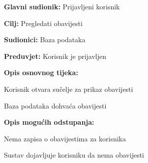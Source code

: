 \noindent {}
\begin{packed_item}

\item \textbf{Glavni sudionik:} Prijavljeni korisnik
\item  \textbf{Cilj:} Pregledati obavijesti
\item  \textbf{Sudionici:} Baza podataka
\item  \textbf{Preduvjet:} Korisnik je prijavljen
\item  \textbf{Opis osnovnog tijeka:}

\item[] \begin{packed_enum}

    \item Korisnik otvara sučelje za prikaz obavijesti
    \item Baza podataka dohvaća obavijesti

\end{packed_enum}

\item  \textbf{Opis mogućih odstupanja:}

\item[] \begin{packed_item}

    \item[2.a] Nema zapisa o obavijestima za korisnika
    \item[] \begin{packed_enum}

        \item Sustav dojavljuje korisniku da nema obavijesti

    \end{packed_enum}

\end{packed_item}
\end{packed_item}

